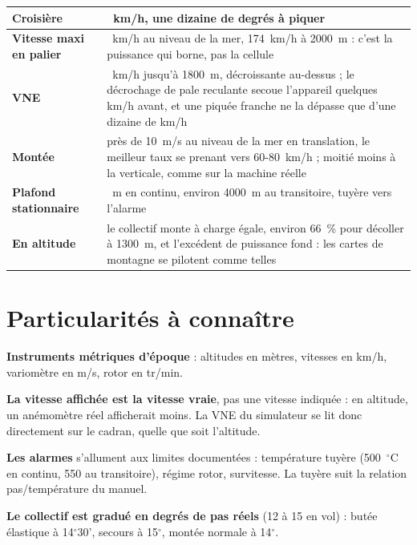 \documentclass[a4paper,12pt]{article}
\begin{document}
\medskip
{\small
\begin{tabularx}{\linewidth}{|>{\raggedright\arraybackslash}m{3.8cm}|>{\raggedright\arraybackslash}X|}
\hline
\textbf{Croisière} & 160~km/h, une dizaine de degrés à piquer \\
\hline
\textbf{Vitesse maxi en palier} & 188~km/h au niveau de la mer, 174~km/h à 2000~m : c'est la puissance qui borne, pas la cellule \\
\hline
\textbf{VNE} & 195~km/h jusqu'à 1800~m, décroissante au-dessus ; le décrochage de pale reculante secoue l'appareil quelques km/h avant, et une piquée franche ne la dépasse que d'une dizaine de km/h \\
\hline
\textbf{Montée} & près de 10~m/s au niveau de la mer en translation, le meilleur taux se prenant vers 60-80~km/h ; moitié moins à la verticale, comme sur la machine réelle \\
\hline
\textbf{Plafond stationnaire} & 3100~m en continu, environ 4000~m au transitoire, tuyère vers l'alarme \\
\hline
\textbf{En altitude} & le collectif monte à charge égale, environ 66~\% pour décoller à 1300~m, et l'excédent de puissance fond : les cartes de montagne se pilotent comme telles \\
\hline
\end{tabularx}}

\section*{Particularités à connaître}
\noindent
\textbf{Instruments métriques d'époque} : altitudes en mètres, vitesses en km/h, variomètre en m/s, rotor en tr/min.

\medskip
\noindent
\textbf{La vitesse affichée est la vitesse vraie}, pas une vitesse indiquée : en altitude, un anémomètre réel afficherait moins. La VNE du simulateur se lit donc directement sur le cadran, quelle que soit l'altitude.

\medskip
\noindent
\textbf{Les alarmes} s'allument aux limites documentées : température tuyère (500~$^\circ$C en continu, 550 au transitoire), régime rotor, survitesse. La tuyère suit la relation pas/température du manuel.

\medskip
\noindent
\textbf{Le collectif est gradué en degrés de pas réels} (12 à 15 en vol) : butée élastique à 14$^\circ$30', secours à 15$^\circ$, montée normale à 14$^\circ$.
\end{document}
